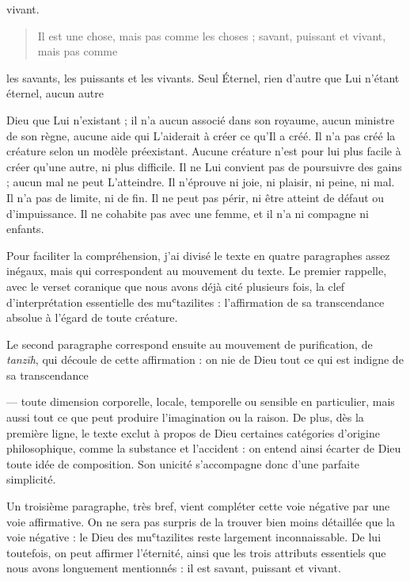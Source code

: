 vivant.

\begin{quote}
Il est une chose, mais pas comme les choses ; savant, puissant et
vivant, mais pas comme
\end{quote}

les savants, les puissants et les vivants. Seul Éternel, rien d'autre
que Lui n'étant éternel, aucun autre

Dieu que Lui n'existant ; il n'a aucun associé dans son royaume, aucun
ministre de son règne, aucune aide qui L'aiderait à créer ce qu'Il a
créé. Il n'a pas créé la créature selon un modèle préexistant. Aucune
créature n'est pour lui plus facile à créer qu'une autre, ni plus
difficile. Il ne Lui convient pas de poursuivre des gains ; aucun mal ne
peut L'atteindre. Il n'éprouve ni joie, ni plaisir, ni peine, ni mal. Il
n'a pas de limite, ni de fin. Il ne peut pas périr, ni être atteint de
défaut ou d'impuissance. Il ne cohabite pas avec une femme, et il n'a ni
compagne ni enfants.

Pour faciliter la compréhension, j'ai divisé le texte en quatre
paragraphes assez inégaux, mais qui correspondent au mouvement du texte.
Le premier rappelle, avec le verset coranique que nous avons déjà cité
plusieurs fois, la clef d'interprétation essentielle des muʿtazilites :
l'affirmation de sa transcendance absolue à l'égard de toute créature.

 

 

Le second paragraphe correspond ensuite au mouvement de purification, de
\emph{tanzīh}, qui découle de cette affirmation : on nie de Dieu tout ce
qui est indigne de sa transcendance

--- toute dimension corporelle, locale, temporelle ou sensible en
particulier, mais aussi tout ce que peut produire l'imagination ou la
raison. De plus, dès la première ligne, le texte exclut à propos de Dieu
certaines catégories d'origine philosophique, comme la substance et
l'accident : on entend ainsi écarter de Dieu toute idée de composition.
Son unicité s'accompagne donc d'une parfaite simplicité.

Un troisième paragraphe, très bref, vient compléter cette voie négative
par une voie affirmative. On ne sera pas surpris de la trouver bien
moins détaillée que la voie négative : le Dieu des muʿtazilites reste
largement inconnaissable. De lui toutefois, on peut affirmer l'éternité,
ainsi que les trois attributs essentiels que nous avons longuement
mentionnés : il est savant, puissant et vivant.

